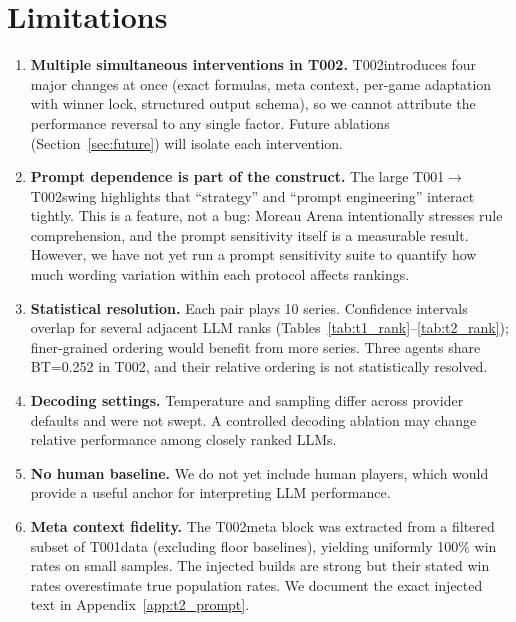 \documentclass[11pt]{article}
\newcommand{\tOne}{T001}
\newcommand{\tTwo}{T002}
\begin{document}
\section{Limitations}
\label{sec:limits}

\begin{enumerate}[leftmargin=*]
\item \textbf{Multiple simultaneous interventions in \tTwo.}
\tTwo introduces four major changes at once (exact formulas, meta context, per-game adaptation with winner lock, structured output schema), so we cannot attribute the performance reversal to any single factor.
Future ablations (Section~\ref{sec:future}) will isolate each intervention.

\item \textbf{Prompt dependence is part of the construct.}
The large \tOne$\to$\tTwo swing highlights that ``strategy'' and ``prompt engineering'' interact tightly.
This is a feature, not a bug: Moreau Arena intentionally stresses rule comprehension, and the prompt sensitivity itself is a measurable result.
However, we have not yet run a prompt sensitivity suite to quantify how much wording variation within each protocol affects rankings.

\item \textbf{Statistical resolution.}
Each pair plays 10 series.
Confidence intervals overlap for several adjacent LLM ranks (Tables~\ref{tab:t1_rank}--\ref{tab:t2_rank}); finer-grained ordering would benefit from more series.
Three agents share BT=0.252 in \tTwo, and their relative ordering is not statistically resolved.

\item \textbf{Decoding settings.}
Temperature and sampling differ across provider defaults and were not swept.
A controlled decoding ablation may change relative performance among closely ranked LLMs.

\item \textbf{No human baseline.}
We do not yet include human players, which would provide a useful anchor for interpreting LLM performance.

\item \textbf{Meta context fidelity.}
The \tTwo meta block was extracted from a filtered subset of \tOne data (excluding floor baselines), yielding uniformly 100\% win rates on small samples.
The injected builds are strong but their stated win rates overestimate true population rates.
We document the exact injected text in Appendix~\ref{app:t2_prompt}.
\end{enumerate}
\end{document}
